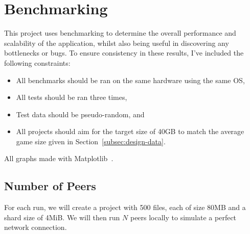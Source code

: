 
\newpage
\section{Benchmarking}\label{sec:benchmark}

This project uses benchmarking to determine the overall performance and scalability of the application, whilst also being useful in discovering any bottlenecks or bugs.
\x
To ensure consistency in these results, I've included the following constraints:

\begin{itemize}
  \item All benchmarks should be ran on the same hardware using the same OS,
  \item All tests should be ran three times,
  \item Test data should be pseudo-random, and
  \item All projects should aim for the target size of 40GB to match the average game size given in Section~\ref{subsec:design-data}.
\end{itemize}

\newparagraph
All graphs made with Matplotlib~\cite{}.

\subsection*{Number of Peers}

For each run, we will create a project with 500 files, each of size 80MB and a shard size of 4MiB. We will then run $N$ peers locally to simulate a perfect network connection.


